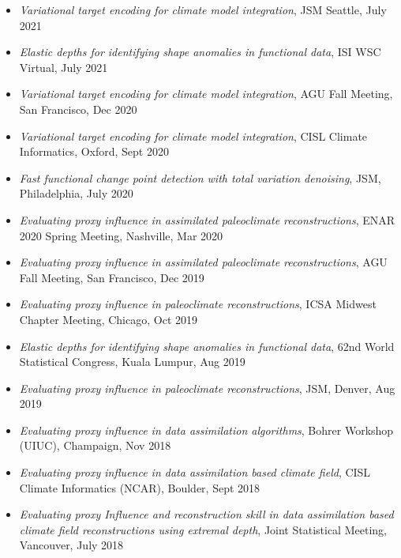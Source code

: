 \documentclass[11pt]{article}
\begin{document}
\begin{itemize}[leftmargin=*,label={}]
    \setlength\itemsep{0.45em}
    
    \item \textit{Variational target encoding for climate model integration}, JSM Seattle, July 2021
    
    \item \textit{Elastic depths for identifying shape anomalies in functional data}, ISI WSC Virtual, July 2021
    
    \item \textit{Variational target encoding for climate model integration},  AGU Fall Meeting, San Francisco, Dec 2020
    
    \item \textit{Variational target encoding for climate model integration}, CISL Climate Informatics, Oxford, Sept 2020
    
    \item \textit{Fast functional change point detection with total variation denoising}, JSM, Philadelphia, July 2020
    
    \item \textit{Evaluating proxy influence in assimilated paleoclimate reconstructions}, ENAR 2020 Spring Meeting, Nashville, Mar 2020

    \item \textit{Evaluating proxy influence in assimilated paleoclimate reconstructions}, AGU Fall Meeting, San Francisco, Dec 2019
    
    \item \textit{Evaluating proxy influence in paleoclimate reconstructions}, ICSA Midwest Chapter Meeting, Chicago, Oct 2019 
    
    \item \textit{Elastic depths for identifying shape anomalies in functional data}, 62nd World Statistical Congress, Kuala Lumpur, Aug 2019
    
    \item \textit{Evaluating proxy influence in paleoclimate reconstructions}, JSM, Denver, Aug 2019 
    
    \item \textit{Evaluating proxy influence in data assimilation algorithms}, Bohrer Workshop (UIUC), Champaign, Nov 2018
    
    \item \textit{Evaluating proxy influence in data assimilation based climate field}, CISL Climate Informatics (NCAR), Boulder, Sept 2018
    
    \item \textit{Evaluating proxy Influence and reconstruction skill in data assimilation based climate field reconstructions using extremal depth}, Joint Statistical Meeting, Vancouver, July 2018
\end{itemize}
\end{document}
